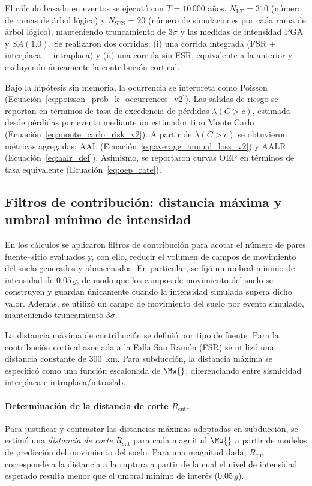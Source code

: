 El cálculo basado en eventos se ejecutó con $T=10\,000$ años, $N_{\text{LT}}=310$ (número de ramas de árbol lógico) y $N_{\text{SES}}=20$ (número de simulaciones por cada rama de árbol lógico), manteniendo truncamiento de $3\sigma$ y las medidas de intensidad PGA y $SA(1.0)$. Se realizaron dos corridas: (i) una corrida integrada (FSR + interplaca + intraplaca) y (ii) una corrida sin FSR, equivalente a la anterior y excluyendo únicamente la contribución cortical.

Bajo la hipótesis sin memoria, la ocurrencia se interpreta como Poisson (Ecuación~\ref{eq:poisson_prob_k_occurrences_v2}). Las salidas de riesgo se reportan en términos de tasa de excedencia de pérdidas $\lambda(C>c)$, estimada desde pérdidas por evento mediante un estimador tipo Monte Carlo (Ecuación~\ref{eq:monte_carlo_risk_v2}). A partir de $\lambda(C>c)$ se obtuvieron métricas agregadas: AAL (Ecuación~\ref{eq:average_annual_loss_v2}) y AALR (Ecuación~\ref{eq:aalr_def}). Asimismo, se reportaron curvas OEP en términos de tasa equivalente (Ecuación~\ref{eq:oep_rate}).

\subsection{Filtros de contribución: distancia máxima y umbral mínimo de intensidad}
\label{sec:meto_event_filtros}

En los cálculos se aplicaron filtros de contribución para acotar el número de pares fuente--sitio evaluados y, con ello, reducir el volumen de campos de movimiento del suelo generados y almacenados. En particular, se fijó un umbral mínimo de intensidad de $0.05\,g$, de modo que los campos de movimiento del suelo se construyen y guardan únicamente cuando la intensidad simulada supera dicho valor. Además, se utilizó un campo de movimiento del suelo por evento simulado, manteniendo truncamiento $3\sigma$.

La distancia máxima de contribución se definió por tipo de fuente. Para la contribución cortical asociada a la Falla San Ramón (FSR) se utilizó una distancia constante de 300~km. Para subducción, la distancia máxima se especificó como una función escalonada de $\Mw{}$, diferenciando entre sismicidad interplaca e intraplaca/intraslab.

\paragraph{Determinación de la distancia de corte $R_{\mathrm{cut}}$.}
Para justificar y contrastar las distancias máximas adoptadas en subducción, se estimó una \emph{distancia de corte} $R_{\mathrm{cut}}$ para cada magnitud $\Mw{}$ a partir de modelos de predicción del movimiento del suelo. Para una magnitud dada, $R_{\mathrm{cut}}$ corresponde a la distancia a la ruptura a partir de la cual el nivel de intensidad esperado resulta menor que el umbral mínimo de interés ($0.05\,g$).

